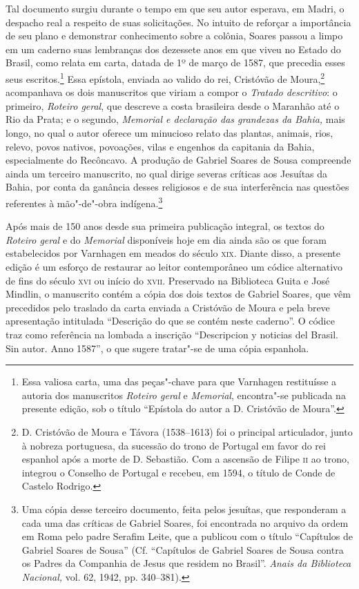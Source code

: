 Tal documento surgiu durante o tempo em que seu autor esperava, em Madri, o despacho
real a respeito de suas solicitações. No intuito de reforçar a
importância de seu plano e demonstrar conhecimento sobre a colônia,
Soares passou a limpo em um caderno suas lembranças dos dezessete anos
em que viveu no Estado do Brasil, como relata em carta, datada de 1º de
março de 1587, que precedia esses seus escritos.\footnote{ Essa valiosa
carta, uma das peças"-chave para que Varnhagen restituísse a autoria dos
manuscritos \textit{Roteiro geral} e \textit{Memorial}, encontra"-se
publicada na presente edição, sob o título “Epístola do autor a D.
Cristóvão de Moura”.} Essa epístola, enviada ao valido do
rei, Cristóvão de Moura,\footnote{ D. Cristóvão de Moura e Távora
(1538--1613) foi o principal articulador, junto à nobreza portuguesa, da
sucessão do trono de Portugal em favor do rei espanhol após a morte de
D. Sebastião. Com a ascensão de Filipe 	\textsc{ii} ao trono, integrou o Conselho
de Portugal e recebeu, em 1594, o título de Conde de Castelo Rodrigo.}
acompanhava os dois manuscritos que viriam a compor o \textit{Tratado
descritivo}: o primeiro, \textit{Roteiro geral}, que descreve a costa
brasileira desde o Maranhão até o Rio da Prata; e o segundo,\textit{
Memorial e declaração das grandezas da Bahia,} mais longo, no qual o
autor oferece um minucioso relato das plantas, animais, rios, relevo,
povos nativos, povoações, vilas e engenhos da capitania da Bahia,
especialmente do Recôncavo.  A produção de Gabriel Soares de Sousa
compreende ainda um terceiro manuscrito, no qual dirige severas
críticas aos Jesuítas da Bahia, por conta da ganância desses religiosos
e de sua interferência nas questões referentes à mão"-de"-obra
indígena.\footnote{ Uma cópia desse terceiro documento, feita pelos
jesuítas, que responderam a cada uma das críticas de Gabriel Soares,
foi encontrada no arquivo da ordem em Roma pelo padre Serafim Leite,
que a publicou com o título “Capítulos de Gabriel Soares de Sousa”
(Cf. “Capítulos de Gabriel Soares de Sousa contra os Padres da
Companhia de Jesus que residem no Brasil”. \textit{Anais da Biblioteca
Nacional,} vol. 62, 1942, pp. 340--381).} 

Após mais de 150 anos desde sua primeira publicação
integral, os textos do \textit{Roteiro geral} e do \textit{Memorial}
disponíveis hoje em dia ainda são os que foram estabelecidos por
Varnhagen em meados do século \textsc{xix}. Diante disso, a presente edição é um
esforço de restaurar ao leitor contemporâneo um códice alternativo de
fins do século \textsc{xvi} ou início do \textsc{xvii}. Preservado na Biblioteca Guita e
José Mindlin, o manuscrito contém a cópia dos dois textos de Gabriel
Soares\textit{,} que vêm precedidos pelo traslado da carta enviada a
Cristóvão de Moura e pela breve apresentação intitulada “Descrição do
que se contém neste caderno”.  O códice traz como referência na lombada
a inscrição “Descripcion y noticias del Brasil. Sin autor. Anno 1587”,
o que sugere tratar"-se de uma cópia espanhola.

